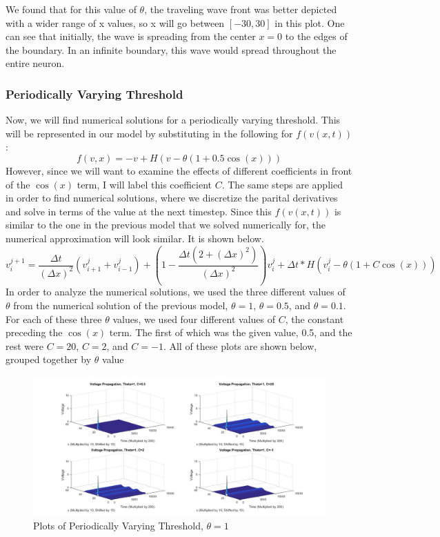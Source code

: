 \documentclass[12pt]{article}
\begin{document}
We found that for this value of $\theta$, the traveling wave front was better depicted with a wider range of x values, so x will go between $[-30,30]$ in this plot. One can see that initially, the wave is spreading from the center $x=0$ to the edges of the boundary. In an infinite boundary, this wave would spread throughout the entire neuron. 
\subsubsection{Periodically Varying Threshold}
Now, we will find numerical solutions for a periodically varying threshold. This will be represented in our model by substituting in the following for $f(v(x,t))$:
\[f(v,x)=-v+H(v-\theta(1+0.5\cos(x)))\]
However, since we will want to examine the effects of different coefficients in front of the $\cos(x)$ term, I will label this coefficient $C$. The same steps are applied in order to find numerical solutions, where we discretize the parital derivatives and solve in terms of the value at the next timestep. Since this $f(v(x,t))$ is similar to the one in the previous model that we solved numerically for, the numerical approximation will look similar. It is shown below. 
\begin{equation} \label{***}
v^{j+1}_i=\frac{\Delta{t}}{(\Delta{x})^2}(v^{j}_{i+1}+v^{j}_{i-1})+(1-\frac{\Delta{t}(2+(\Delta{x})^2)}{(\Delta{x})^2})v^{j}_{i}+\Delta{t}*H(v^j_i-\theta(1+C\cos(x)))
\end {equation}
In order to analyze the numerical solutions, we used the three different values of $\theta$ from the numerical solution of the previous model, $\theta=1$, $\theta=0.5$, and $\theta=0.1$. For each of these three $\theta$ values, we used four different values of $C$, the constant preceding the $\cos(x)$ term. The first of which was the given value, 0.5, and the rest were $C=20$, $C=2$, and $C=-1$. All of these plots are shown below, grouped together by $\theta$ value
\begin{figure}[H]
  \includegraphics[width=\linewidth]{thetaone3.jpg}
  \caption{Plots of Periodically Varying Threshold, $\theta=1$}
  \label{fig:sketch7}
\end{figure}
\end{document}
